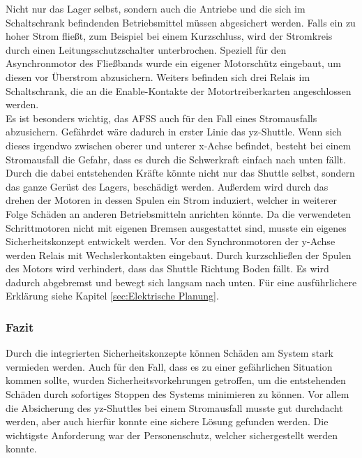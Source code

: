 Nicht nur das Lager selbst, sondern auch die Antriebe und die sich im Schaltschrank befindenden Betriebsmittel müssen abgesichert werden. Falls ein zu hoher Strom fließt, zum Beispiel bei einem Kurzschluss, wird der Stromkreis durch einen Leitungsschutzschalter unterbrochen. Speziell für den Asynchronmotor des Fließbands wurde ein eigener Motorschütz eingebaut, um diesen vor Überstrom abzusichern. Weiters befinden sich drei Relais im Schaltschrank, die an die Enable-Kontakte der Motortreiberkarten angeschlossen werden.\\
Es ist besonders wichtig, das AFSS auch für den Fall eines Stromausfalls abzusichern. Gefährdet wäre dadurch in erster Linie das yz-Shuttle. Wenn sich dieses irgendwo zwischen oberer und unterer x-Achse befindet, besteht bei einem Stromausfall die Gefahr, dass es durch die Schwerkraft einfach nach unten fällt. Durch die dabei entstehenden Kräfte könnte nicht nur das Shuttle selbst, sondern das ganze Gerüst des Lagers, beschädigt werden. Außerdem wird durch das drehen der Motoren in dessen Spulen ein Strom induziert, welcher in weiterer Folge Schäden an anderen Betriebsmitteln anrichten könnte. Da die verwendeten Schrittmotoren nicht mit eigenen Bremsen ausgestattet sind, musste ein eigenes Sicherheitskonzept entwickelt werden. Vor den Synchronmotoren der y-Achse werden Relais mit Wechslerkontakten eingebaut. Durch kurzschließen der Spulen des Motors wird verhindert, dass das Shuttle Richtung Boden fällt. Es wird dadurch abgebremst und bewegt sich langsam nach unten. Für eine ausführlichere Erklärung siehe Kapitel \ref{sec:Elektrische Planung}.

\subsubsection{Fazit}
Durch die integrierten Sicherheitskonzepte können Schäden am System stark vermieden werden. Auch für den Fall, dass es zu einer gefährlichen Situation kommen sollte, wurden Sicherheitsvorkehrungen getroffen, um die entstehenden Schäden durch sofortiges Stoppen des Systems minimieren zu können. Vor allem die Absicherung des yz-Shuttles bei einem Stromausfall musste gut durchdacht werden, aber auch hierfür konnte eine sichere Lösung gefunden werden. Die wichtigste Anforderung war der Personenschutz, welcher sichergestellt werden konnte.